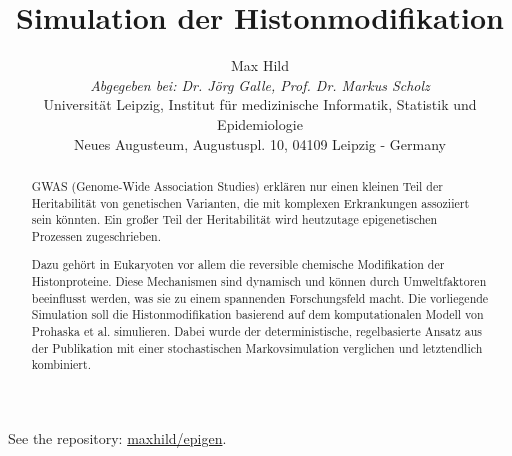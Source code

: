 \documentclass{SeminarV2}
\begin{document}
\title{Simulation der Histonmodifikation}

\author{Max Hild
\vspace{.3cm}\\
%
\emph{Abgegeben bei: Dr. J\"{o}rg Galle, Prof. Dr. Markus Scholz}
\vspace{.1cm}\\
Universit\"{a}t Leipzig, Institut f\"{u}r medizinische Informatik, Statistik und Epidemiologie\\
Neues Augusteum, Augustuspl. 10, 04109 Leipzig - Germany
}
See the repository: \href{https://github.com/maxhild/epigen}{maxhild/epigen}.


\maketitle

\begin{abstract}
  \sloppy
  GWAS (Genome-Wide Association Studies) erklären nur einen kleinen Teil der Heritabilität von 
  genetischen Varianten, die mit komplexen Erkrankungen assoziiert sein k\"{o}nnten.
  \cite{mcclellan-2010} Ein großer Teil der Heritabilität wird heutzutage epigenetischen Prozessen
  zugeschrieben.
    
  Dazu gehört in Eukaryoten vor allem die reversible chemische Modifikation der Histonproteine. \cite{prohaska-2010}
  Diese Mechanismen sind dynamisch und k\"{o}nnen durch Umweltfaktoren beeinflusst werden, 
  was sie zu einem spannenden Forschungsfeld macht. Die vorliegende Simulation soll die 
  Histonmodifikation basierend auf dem komputationalen Modell von Prohaska et al. simulieren.
  Dabei wurde der deterministische, regelbasierte Ansatz aus der Publikation mit einer 
  stochastischen Markovsimulation verglichen und letztendlich kombiniert.
  \end{abstract}
  
\end{document}
